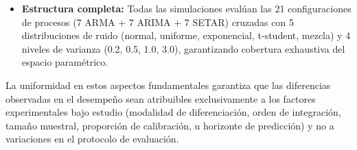 \begin{itemize}
\item \textbf{Estructura completa:} Todas las simulaciones evalúan las 21 configuraciones de procesos (7 ARMA + 7 ARIMA + 7 SETAR) cruzadas con 5 distribuciones de ruido (normal, uniforme, exponencial, t-student, mezcla) y 4 niveles de varianza (0.2, 0.5, 1.0, 3.0), garantizando cobertura exhaustiva del espacio paramétrico.
\end{itemize}

La uniformidad en estos aspectos fundamentales garantiza que las diferencias observadas en el desempeño sean atribuibles exclusivamente a los factores experimentales bajo estudio (modalidad de diferenciación, orden de integración, tamaño muestral, proporción de calibración, u horizonte de predicción) y no a variaciones en el protocolo de evaluación.